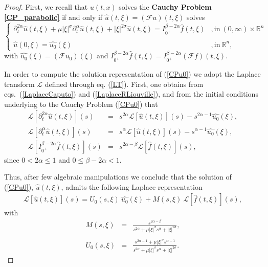 \documentclass{amsart}
\theoremstyle{definition}
\theoremstyle{remark}
\numberwithin{equation}{section}
\begin{document}
	\begin{proof}
	First, we recall that $u(t,x)$ solves the {\bf Cauchy Problem \ref{CP_parabolic}} if and only if $\widehat{u}(t,\xi)=(\mathcal{F}u)(t,\xi)$ solves
	\begin{equation}\label{CPu0}
		\begin{cases}
			\displaystyle \partial^{2\alpha}_t \widehat{u}(t,\xi)+\mu |\xi|^{\sigma}\partial^\alpha_t \widehat{u}(t,\xi)+|\xi|^{2\sigma} \widehat{u}(t,\xi)=I^{\beta-2\alpha}_{0^+}\widehat{f}(t,\xi)&,\mbox{in} ~(0,\infty)\times \mathbb{R}^n \\ \ \\
			\widehat{u}(0,\xi)=\widehat{u_0}(\xi)&,\mbox{in}~\mathbb{R}^n,
		\end{cases}
	\end{equation}
	with $\widehat{u_0}(\xi)=(\mathcal{F}u_0)(\xi)$ and $I^{\beta-2\alpha}_{0^+}\widehat{f}(t,\xi)=I^{\beta-2\alpha}_{0^+}(\mathcal{F}f)(t,\xi)$.
	
	In order to compute the solution representation of (\ref{CPu0}) we adopt the Laplace transform $\mathcal{L}$ defined through eq. (\ref{LT}). First, one obtains from eqs.~(\ref{LaplaceCaputo}) and (\ref{LaplaceRLiouville}), and from the initial conditions underlying to the Cauchy Problem (\ref{CPu0}) that
	\begin{eqnarray*}
		\mathcal{L}[\partial^{2\alpha}_t \widehat{u}(t,\xi)](s)&=&s^{2\alpha}\mathcal{L}[ \widehat{u}(t,\xi)](s)-s^{2\alpha-1}\widehat{u_0}(\xi), \\
		\mathcal{L}[\partial^{\alpha}_t \widehat{u}(t,\xi)](s)&=&s^{\alpha}\mathcal{L}[ \widehat{u}(t,\xi)](s)-s^{\alpha-1}\widehat{u_0}(\xi), \\
		\mathcal{L}[I^{\beta-2\alpha}_{0^+} \widehat{f}(t,\xi)](s)&=&s^{2\alpha-\beta}\mathcal{L}[ \widehat{f}(t,\xi)](s),
	\end{eqnarray*}
	since $0<2\alpha\leq 1$ and $0\leq \beta-2\alpha< 1$.
	
	Thus, after few algebraic manipulations we conclude that the solution of (\ref{CPu0}), $\widehat{u}(t,\xi)$, admits the following Laplace representation
	\begin{eqnarray}
		\label{Us}\mathcal{L}[\widehat{u}(t,\xi)](s)=U_0(s,\xi)~\widehat{u_0}(\xi)+M(s,\xi)~\mathcal{L}[\widehat{f}(t,\xi)](s),
	\end{eqnarray}
	with 
	\begin{eqnarray}
		\label{M}M(s,\xi)&=&\frac{s^{2\alpha-\beta}}{s^{2\alpha}+\mu |\xi|^\sigma s^{\alpha} +|\xi|^{2\sigma}}, \\ \nonumber \\
		\label{U0}U_0(s,\xi)&=&\frac{s^{2\alpha-1}+\mu |\xi|^\sigma s^{\alpha-1}}{s^{2\alpha}+\mu |\xi|^\sigma s^{\alpha} +|\xi|^{2\sigma}}. 
	\end{eqnarray}
	

\end{proof}
\end{document}
